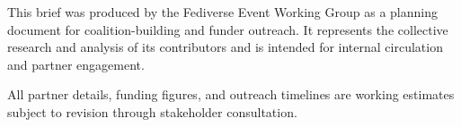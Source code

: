 \noindent This brief was produced by the Fediverse Event Working Group as a planning document for coalition-building and funder outreach. It represents the collective research and analysis of its contributors and is intended for internal circulation and partner engagement.

\vspace{1em}
\noindent All partner details, funding figures, and outreach timelines are working estimates subject to revision through stakeholder consultation.

